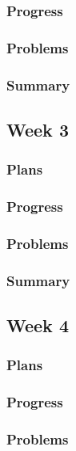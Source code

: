 \documentclass[onecolumn, draftclsnofoot,10pt, compsoc]{article}
\begin{document}
			\subsubsection{Progress}
			
			\subsubsection{Problems}
			
			\subsubsection{Summary}
			
		\subsection{Week 3}
			\subsubsection{Plans}
			
			\subsubsection{Progress}
			
			\subsubsection{Problems}
			
			\subsubsection{Summary}
			
		\subsection{Week 4}
			\subsubsection{Plans}
			
			\subsubsection{Progress}
			
			\subsubsection{Problems}
			
\end{document}
